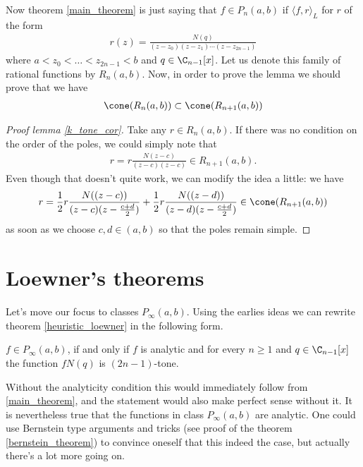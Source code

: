 Now theorem \ref{main_theorem} is just saying that $f \in P_{n}(a, b)$ if $\langle f, r \rangle_{L}$ for $r$ of the form
\begin{align*}
	r(z) = \frac{N(q)}{(z - z_{0}) (z - z_{1}) \cdots (z - z_{2 n - 1})}
\end{align*}
where $a < z_{0} < \ldots < z_{2 n - 1} < b$ and $q \in \C_{n - 1}[x]$. Let us denote this family of rational functions by $R_{n}(a, b)$. Now, in order to prove the lemma we should prove that we have
\begin{align*}
	\cone(R_{n}(a, b)) \subset \cone(R_{n + 1}(a, b))
\end{align*}

\begin{proof}[Proof lemma \ref{k_tone_cor}]
	Take any $r \in R_{n}(a, b)$. If there was no condition on the order of the poles, we could simply note that
	\begin{align*}
		r = r \frac{N(z - c)}{(z - c) (z - c)} \in R_{n + 1}(a, b).
	\end{align*}
	Even though that doesn't quite work, we can modify the idea a little: we have
	\begin{align*}
		r = \frac{1}{2} r \frac{N((z - c))}{(z - c) (z - \frac{c + d}{2})} +  \frac{1}{2} r\frac{N((z - d))}{(z - d) (z - \frac{c + d}{2})} \in \cone(R_{n + 1}(a, b))
	\end{align*}
	as soon as we choose $c, d \in (a, b)$ so that the poles remain simple.
\end{proof}

\section{Loewner's theorems}

Let's move our focus to classes $P_{\infty}(a, b)$. Using the earlies ideas we can rewrite theorem \ref{heuristic_loewner} in the following form.

\begin{lause}\label{better_loewner}
	$f \in P_{\infty}(a, b)$, if and only if $f$ is analytic and for every $n \geq 1$ and $q \in \C_{n - 1}[x]$ the function $f N(q)$ is $(2 n - 1)$-tone.
\end{lause}

Without the analyticity condition this would immediately follow from \ref{main_theorem}, and the statement would also make perfect sense without it. It is nevertheless true that the functions in class $P_{\infty}(a, b)$ are analytic. One could use Bernstein type arguments and tricks (see proof of the theorem \ref{bernstein_theorem}) to convince oneself that this indeed the case, but actually there's a lot more going on.

